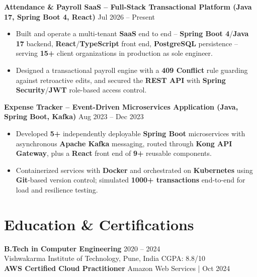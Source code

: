 \documentclass[a4paper,10pt]{article}
\begin{document}
\textbf{Attendance \& Payroll SaaS -- Full-Stack Transactional Platform (Java 17, Spring Boot 4, React)} \hfill Jul 2026 -- Present
\begin{itemize}[leftmargin=*]
    \item Built and operate a multi-tenant \textbf{SaaS} end to end -- \textbf{Spring Boot 4}/\textbf{Java 17} backend, \textbf{React}/\textbf{TypeScript} front end, \textbf{PostgreSQL} persistence -- serving \textbf{15+} client organizations in production as sole engineer.
    \item Designed a transactional payroll engine with a \textbf{409 Conflict} rule guarding against retroactive edits, and secured the \textbf{REST API} with \textbf{Spring Security}/\textbf{JWT} role-based access control.
\end{itemize}

\textbf{Expense Tracker -- Event-Driven Microservices Application (Java, Spring Boot, Kafka)} \hfill Aug 2023 -- Dec 2023
\begin{itemize}[leftmargin=*]
    \item Developed \textbf{5+} independently deployable \textbf{Spring Boot} microservices with asynchronous \textbf{Apache Kafka} messaging, routed through \textbf{Kong API Gateway}, plus a \textbf{React} front end of \textbf{9+} reusable components.
    \item Containerized services with \textbf{Docker} and orchestrated on \textbf{Kubernetes} using \textbf{Git}-based version control; simulated \textbf{1000+ transactions} end-to-end for load and resilience testing.
\end{itemize}

\section*{Education \& Certifications}
\textbf{B.Tech in Computer Engineering} \hfill 2020 -- 2024 \\
Vishwakarma Institute of Technology, Pune, India \hfill CGPA: 8.8/10 \\
\textbf{AWS Certified Cloud Practitioner} \hfill Amazon Web Services \;|\; Oct 2024
\end{document}
